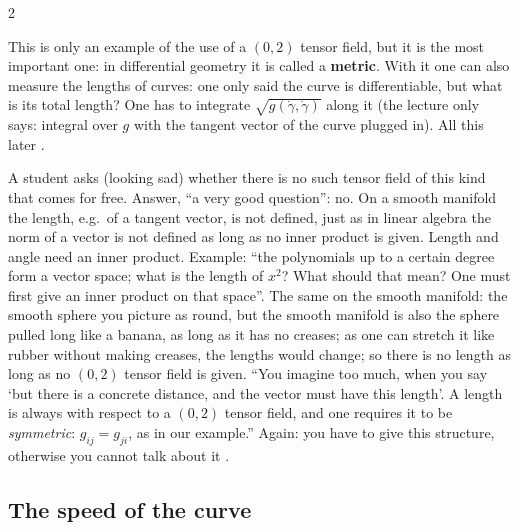 \begin{paracol}{2}
\begin{aside}
This is only an example of the use of a $(0,2)$ tensor field, but it is the most important one: in differential geometry it is called a \textbf{metric}. With it one can
also measure the lengths of curves: one only said the curve is differentiable, but what is its total length? One has to integrate $\sqrt{g(\dot\gamma,\dot\gamma)}$ along it
(the lecture only says: integral over $g$ with the tangent vector of the curve plugged in). All this later .
\end{aside}

A student asks (looking sad) whether there is no such tensor field of this kind that comes for free. Answer, ``a very good question'': no. On a smooth manifold the length, e.g.\ of a
tangent vector, is not defined, just as in linear algebra the norm of a vector is not defined as long as no inner product is given. Length and angle need an inner
product. Example: ``the polynomials up to a certain degree form a vector space; what is the length of $x^2$? What should that mean? One must first give an inner product
on that space''. The same on the smooth manifold: the smooth sphere you picture as round, but the smooth manifold is also the sphere pulled long like a banana, as long as it has no
creases; as one can stretch it like rubber without making creases, the lengths would change; so there is no length as long as no $(0,2)$ tensor field is given. ``You imagine too much,
when you say `but there is a concrete distance, and the vector must have this length'. A length is always with respect to a $(0,2)$ tensor field, and one requires it to be \emph{symmetric}:
$g_{ij}=g_{ji}$, as in our example.'' Again: you have to give this structure, otherwise you cannot talk about it .

\subsection{The speed of the curve}


\end{paracol}
